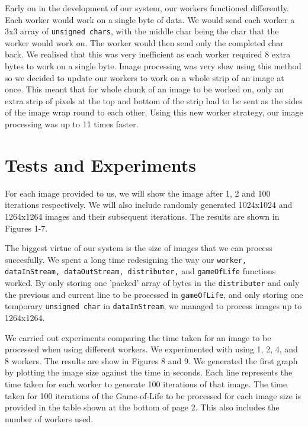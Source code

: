 \documentclass{article}
\begin{document}
\begin{multicols}{2}
\vspace{3mm}

Early on in the development of our system, our workers functioned differently. Each worker would work
on a single byte of data. We would send each worker a 3x3 array of \texttt{unsigned chars}, with the middle
char being the char that the worker would work on. The worker would then send only the completed
char back. We realised that this was very inefficient as each worker required 8 extra bytes to work
on a single byte. Image processing was very slow using this method so we decided to update
our workers to work on a whole strip of an image at once. This meant that for whole chunk of an image
to be worked on, only an extra strip of pixels at the top and bottom of the strip had to be sent as
the sides of the image wrap round to each other. Using this new worker strategy, our image processing
was up to 11 times faster.

\section{Tests and Experiments}
For each image provided to us, we will show the image after 1, 2 and 100
iterations respectively. We will also include randomly generated 1024x1024 and 1264x1264 images and their
subsequent iterations. The results are shown in Figures 1-7.

\vspace{3mm}

The biggest virtue of our system is the size of images that we can process succesfully. We spent a long
time redesigning the way our \texttt{worker, dataInStream, dataOutStream, distributer,} and \texttt{gameOfLife}
functions worked. By only storing one 'packed' array of bytes in the \texttt{distributer} and only the previous and current
line to be processed in \texttt{gameOfLife}, and only storing one temporary \texttt{unsigned char} in \texttt{dataInStream},
we managed to process images up to 1264x1264.

\vspace{3mm}

We carried out experiments comparing the time taken for an image to be processed when using different
workers. We experimented with using 1, 2, 4, and 8 workers. The results are show in Figures 8 and 9. We
generated the first graph by plotting the image size against the time in seconds. Each line represents the
time taken for each worker to generate 100 iterations of that image. The time taken for 100 iterations of
the Game-of-Life to be processed for each image size is provided in the table shown at the bottom of page
2. This also includes the number of workers used.


\end{multicols}
\end{document}
